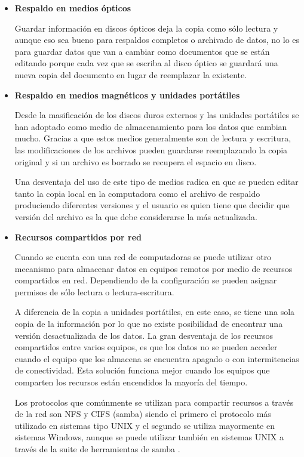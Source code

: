     \begin{itemize}

      \item \textbf{Respaldo en medios \'{opticos}}

Guardar informaci\'{o}n en discos \'{o}pticos deja la copia como s\'{o}lo lectura y aunque eso sea bueno para respaldos completos o archivado de datos, no lo es para guardar datos que van a cambiar como documentos que se est\'{a}n editando porque cada vez que se escriba al disco \'{o}ptico se guardar\'{a} una nueva copia del documento en lugar de reemplazar la existente.

      \item \textbf{Respaldo en medios magn\'{e}ticos y unidades port\'{a}tiles}

Desde la masificaci\'{o}n de los discos duros externos y las unidades port\'{a}tiles se han adoptado como medio de almacenamiento para los datos que cambian mucho. Gracias a que estos medios generalmente son de lectura y escritura, las modificaciones de los archivos pueden guardarse reemplazando la copia original y si un archivo es borrado se recupera el espacio en disco.

Una desventaja del uso de este tipo de medios radica en que se pueden editar tanto la copia local en la computadora como el archivo de respaldo produciendo diferentes versiones y el usuario es quien tiene que decidir que versi\'{o}n del archivo es la que debe considerarse la m\'{a}s actualizada.

      \item \textbf{Recursos compartidos por red}

Cuando se cuenta con una red de computadoras se puede utilizar otro mecanismo para almacenar datos en equipos remotos por medio de recursos compartidos en red. Dependiendo de la configuraci\'{o}n se pueden asignar permisos de s\'{o}lo lectura o lectura-escritura.

A diferencia de la copia a unidades port\'{a}tiles, en este caso, se tiene una sola copia de la informaci\'{o}n por lo que no existe posibilidad de encontrar una versi\'{o}n desactualizada de los datos. La gran desventaja de los recursos compartidos entre varios equipos, es que los datos no se pueden acceder cuando el equipo que los almacena se encuentra apagado o con intermitencias de conectividad. Esta soluci\'{o}n funciona mejor cuando los equipos que comparten los recursos est\'{a}n encendidos la mayor\'{i}a del tiempo.

Los protocolos que com\'{u}nmente se utilizan para compartir recursos a trav\'{e}s de la red son \textsc{NFS} y \textsc{CIFS} (samba) siendo el primero el protocolo m\'{a}s utilizado en sistemas tipo \textsc{UNIX} y el segundo se utiliza mayormente en sistemas Windows, aunque se puede utilizar tambi\'{e}n en sistemas \textsc{UNIX} a trav\'{e}s de la suite de herramientas de samba \cite{_samba_????}.


\end{itemize}
